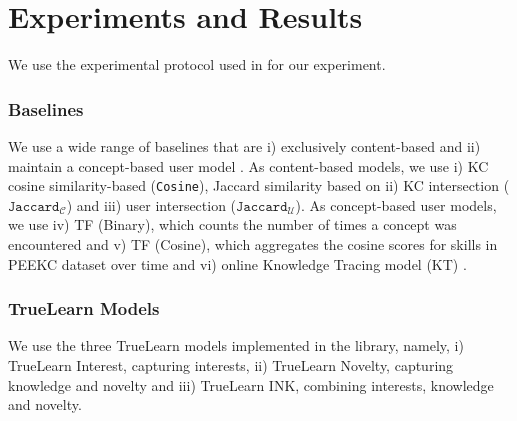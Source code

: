 \documentclass[letterpaper]{article} %
\begin{document}
\section{Experiments and Results}

We use the experimental protocol used in \cite{bulathwela2022sus} for our experiment.

\subsubsection{Baselines} We use a wide range of baselines that are i) exclusively content-based and ii) maintain a concept-based user model \cite{zarrinkalam2020extracting}. As content-based models, we use i) KC cosine similarity-based (\texttt{Cosine}), Jaccard similarity based on ii) KC intersection ($\texttt{Jaccard}_{\mathcal{C}}$) and iii) user intersection ($\texttt{Jaccard}_{\mathcal{U}}$). As concept-based user models, we use iv) TF (Binary), which counts the number of times a concept was encountered and v) TF (Cosine), which aggregates the cosine scores for skills in PEEKC dataset over time and vi) online Knowledge Tracing model (KT) \cite{bishopsnewbook}.

\subsubsection{TrueLearn Models} We use the three TrueLearn models implemented in the library, namely, i) TrueLearn Interest, capturing interests, ii) TrueLearn Novelty, capturing knowledge and novelty and iii) TrueLearn INK, combining interests, knowledge and novelty.

\end{document}
